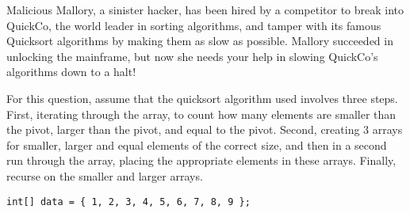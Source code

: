 \begin{blocksection}
Malicious Mallory, a sinister hacker, has been hired by a competitor to break
into QuickCo, the world leader in sorting algorithms, and tamper with its
famous Quicksort algorithms by making them as slow as possible. Mallory
succeeded in unlocking the mainframe, but now she needs your help in slowing
QuickCo's algorithms down to a halt!

For this question, assume that the quicksort algorithm used involves three steps. 
First, iterating through the array, to count how many elements are smaller than 
the pivot, larger than the pivot, and equal to the pivot. Second, creating 3 arrays 
for smaller, larger and equal elements of the correct size, and then in a second
run through the array, placing the appropriate elements in these arrays. Finally,
recurse on the smaller and larger arrays.

\begin{lstlisting}
int[] data = { 1, 2, 3, 4, 5, 6, 7, 8, 9 };
\end{lstlisting}
\end{blocksection}
